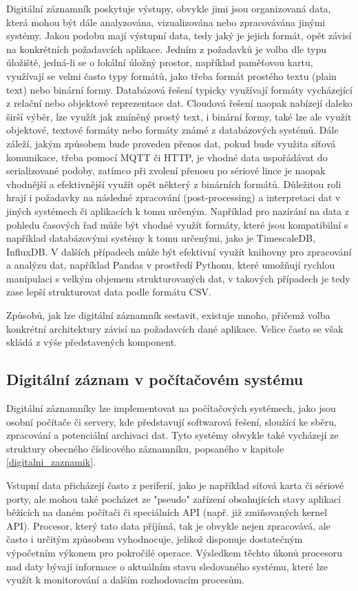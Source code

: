 Digitální záznamník poskytuje výstupy, obvykle jimi jsou organizovaná data, která mohou být dále analyzována, vizualizována nebo zpracovávána jinými systémy. Jakou podobu mají výstupní data, tedy jaký je jejich formát, opět závisí na konkrétních požadavcích aplikace. Jedním z požadavků je volba dle typu úložiště, jedná-li se o lokální úložný prostor, například paměťovou kartu, využívají se velmi často typy formátů, jako třeba formát prostého textu (plain text) nebo binární formy. Databázová řešení typicky využívají formáty vycházející z relační nebo objektové reprezentace dat. Cloudová řešení naopak nabízejí daleko širší výběr, lze využít jak zmíněný prostý text, i binární formy, také lze ale využít objektové, textové formáty nebo formáty známé z databázových systémů. Dále záleží, jakým způsobem bude proveden přenos dat, pokud bude využita síťová komunikace, třeba pomocí MQTT či HTTP, je vhodné data uspořádávat do serializované podoby, zatímco při zvolení přenosu po sériové lince je naopak vhodnější a efektivnější využít opět některý z binárních formátů. Důležitou roli hrají i požadavky na následné zpracování (post-processing) a interpretaci dat v jiných systémech či aplikacích k tomu určeným. Například pro nazírání na data z pohledu časových řad může být vhodné využít formáty, které jsou kompatibilní s například databázovými systémy k tomu určenými, jako je TimescaleDB, InfluxDB. V dalších případech může být efektivní využít knihovny pro zpracování a analýzu dat, například Pandas v prostředí Pythonu, které umožňují rychlou manipulaci s velkým objemem strukturovaných dat, v takových případech je tedy zase lepší strukturovat data podle formátu CSV. \cite{medium_optimalization_iot_data_storage_timescaledb}

Způsobů, jak lze digitální záznamník sestavit, existuje mnoho, přičemž volba konkrétní architektury závisí na požadavcích dané aplikace. Velice často se však skládá z výše představených komponent. 

\subsection{Digitální záznam v počítačovém systému}
Digitální záznamníky lze implementovat na počítačových systémech, jako jsou osobní počítače či servery, kde představují softwarová řešení, sloužící ke sběru, zpracování a potenciální archivaci dat. Tyto systémy obvykle také vycházejí ze struktury obecného číslicového záznamníku, popsaného v kapitole \ref{digitalni_zaznamik}. 

Vstupní data přicházejí často z periferií, jako je například síťová karta či sériové porty, ale mohou také pocházet ze "pseudo" zařízení obsahujících stavy aplikací běžících na daném počítači či speciálních API (např. již zmiňovaných kernel API). Procesor, který tato data příjímá, tak je obvykle nejen zpracovává, ale často i určitým způsobem vyhodnocuje, jelikož disponuje dostatečným výpočetním výkonem pro pokročilé operace. Výsledkem těchto úkonů procesoru nad daty bývají informace o aktuálním stavu sledovaného systému, které lze využít k monitorování a dalším rozhodovacím procesům. \cite{linux_in_action_log_and_monitoring}

